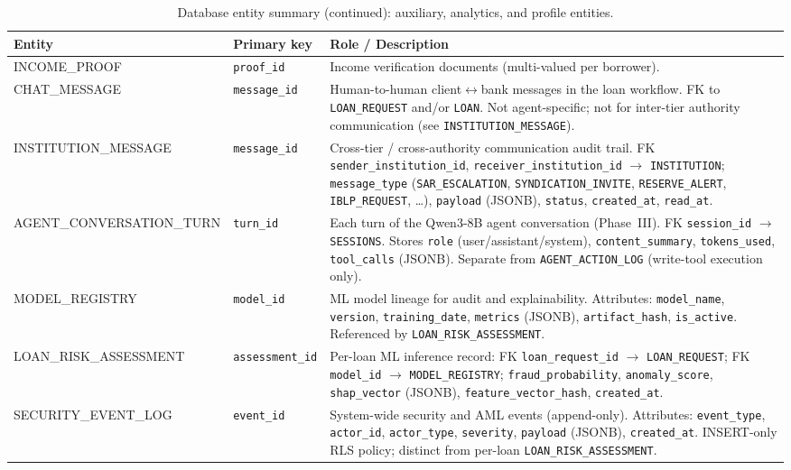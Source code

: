 \documentclass[12pt,a4paper]{report}
\newcommand{\tableheadcolor}{\rowcolor{TableHeadBg}}
\begin{document}
\newpage
\begin{table}[H]
\centering
\caption[Database entity summary (continued)]{Database entity summary (continued): auxiliary, analytics, and profile entities.}
\small
\begin{tabular}{@{}p{2.6cm}p{3.4cm}p{7.0cm}@{}}
\toprule
\tableheadcolor
\textbf{Entity} & \textbf{Primary key} & \textbf{Role / Description} \\
\midrule
INCOME\_PROOF & \texttt{proof\_id} & Income verification documents (multi-valued per borrower). \\
CHAT\_MESSAGE & \texttt{message\_id} & Human-to-human client$\leftrightarrow$bank messages in the loan workflow. FK to \texttt{LOAN\_REQUEST} and/or \texttt{LOAN}. Not agent-specific; not for inter-tier authority communication (see \texttt{INSTITUTION\_MESSAGE}). \\
INSTITUTION\_MESSAGE & \texttt{message\_id} & Cross-tier / cross-authority communication audit trail. FK \texttt{sender\_institution\_id}, \texttt{receiver\_institution\_id} $\to$ \texttt{INSTITUTION}; \texttt{message\_type} (\texttt{SAR\_ESCALATION}, \texttt{SYNDICATION\_INVITE}, \texttt{RESERVE\_ALERT}, \texttt{IBLP\_REQUEST}, \ldots), \texttt{payload} (JSONB), \texttt{status}, \texttt{created\_at}, \texttt{read\_at}. \\
AGENT\_CONVERSATION\_TURN & \texttt{turn\_id} & Each turn of the Qwen3-8B agent conversation (Phase~III). FK \texttt{session\_id} $\to$ \texttt{SESSIONS}. Stores \texttt{role} (user/assistant/system), \texttt{content\_summary}, \texttt{tokens\_used}, \texttt{tool\_calls} (JSONB). Separate from \texttt{AGENT\_ACTION\_LOG} (write-tool execution only). \\
MODEL\_REGISTRY & \texttt{model\_id} & ML model lineage for audit and explainability. Attributes: \texttt{model\_name}, \texttt{version}, \texttt{training\_date}, \texttt{metrics} (JSONB), \texttt{artifact\_hash}, \texttt{is\_active}. Referenced by \texttt{LOAN\_RISK\_ASSESSMENT}. \\
LOAN\_RISK\_ASSESSMENT & \texttt{assessment\_id} & Per-loan ML inference record: FK \texttt{loan\_request\_id} $\to$ \texttt{LOAN\_REQUEST}; FK \texttt{model\_id} $\to$ \texttt{MODEL\_REGISTRY}; \texttt{fraud\_probability}, \texttt{anomaly\_score}, \texttt{shap\_vector} (JSONB), \texttt{feature\_vector\_hash}, \texttt{created\_at}. \\
SECURITY\_EVENT\_LOG & \texttt{event\_id} & System-wide security and AML events (append-only). Attributes: \texttt{event\_type}, \texttt{actor\_id}, \texttt{actor\_type}, \texttt{severity}, \texttt{payload} (JSONB), \texttt{created\_at}. INSERT-only RLS policy; distinct from per-loan \texttt{LOAN\_RISK\_ASSESSMENT}. \\

\end{tabular}
\end{table}
\end{document}
